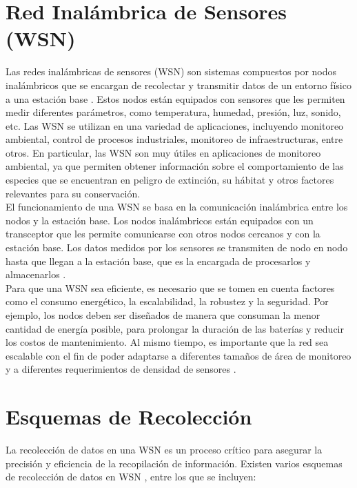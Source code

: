 \section{Red Inalámbrica de Sensores (WSN)}

Las redes inalámbricas de sensores (WSN) son sistemas compuestos por nodos inalámbricos que se encargan de recolectar y transmitir datos de un entorno físico a una estación base \cite{63}. Estos nodos están equipados con sensores que les permiten medir diferentes parámetros, como temperatura, humedad, presión, luz, sonido, etc.
Las WSN se utilizan en una variedad de aplicaciones, incluyendo monitoreo ambiental, control de procesos industriales, monitoreo de infraestructuras, entre otros. En particular, las WSN son muy útiles en aplicaciones de monitoreo ambiental, ya que permiten obtener información sobre el comportamiento de las especies que se encuentran en peligro de extinción, su hábitat y otros factores relevantes para su conservación.\\
El funcionamiento de una WSN se basa en la comunicación inalámbrica entre los nodos y la estación base. Los nodos inalámbricos están equipados con un transceptor que les permite comunicarse con otros nodos cercanos y con la estación base. Los datos medidos por los sensores se transmiten de nodo en nodo hasta que llegan a la estación base, que es la encargada de procesarlos y almacenarlos \cite{64}.\\
Para que una WSN sea eficiente, es necesario que se tomen en cuenta factores como el consumo energético, la escalabilidad, la robustez y la seguridad. Por ejemplo, los nodos deben ser diseñados de manera que consuman la menor cantidad de energía posible, para prolongar la duración de las baterías y reducir los costos de mantenimiento. Al mismo tiempo, es importante que la red sea escalable con el fin de poder adaptarse a diferentes tamaños de área de monitoreo y a diferentes requerimientos de densidad de sensores \cite{65}.

\section{Esquemas de Recolección}

La recolección de datos en una WSN es un proceso crítico para asegurar la precisión y eficiencia de la recopilación de información. Existen varios esquemas de recolección de datos en WSN \cite{66}, entre los que se incluyen:


